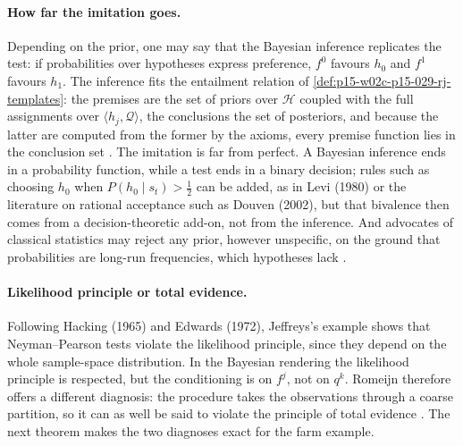 \paragraph{How far the imitation goes.}
Depending on the prior, one may say that the Bayesian inference
replicates the test: if probabilities over hypotheses express
preference, \(f^0\) favours \(h_0\) and \(f^1\) favours \(h_1\). The
inference fits the entailment relation of
\cref{def:p15-w02c-p15-029-rj-templates}: the premises are the set of
priors over \(\mathcal H\) coupled with the full assignments over
\(\langle h_j,\mathcal Q\rangle\), the conclusions the set of
posteriors, and because the latter are computed from the former by the
axioms, every premise function lies in the conclusion set
\cite[p.~642]{Romeijn2011InductiveLogicStatistics}. The imitation is
far from perfect. A Bayesian inference ends in a probability function,
while a test ends in a binary decision; rules such as choosing \(h_0\)
when \(P(h_0\mid s_t)>\tfrac12\) can be added, as in Levi (1980) or the
literature on rational acceptance such as Douven (2002), but that
bivalence then comes from a decision-theoretic add-on, not from the
inference. And advocates of classical statistics may reject any prior,
however unspecific, on the ground that probabilities are long-run
frequencies, which hypotheses lack \cite[p.~642]{Romeijn2011InductiveLogicStatistics}.

\paragraph{Likelihood principle or total evidence.}
Following Hacking (1965) and Edwards (1972), Jeffreys's example shows
that Neyman--Pearson tests violate the likelihood principle, since they
depend on the whole sample-space distribution. In the Bayesian
rendering the likelihood principle is respected, but the conditioning is
on \(f^j\), not on \(q^k\). Romeijn therefore offers a different
diagnosis: the procedure takes the observations through a coarse
partition, so it can as well be said to violate the principle of total
evidence \cite[pp.~642--643]{Romeijn2011InductiveLogicStatistics}. The
next theorem makes the two diagnoses exact for the farm example.

